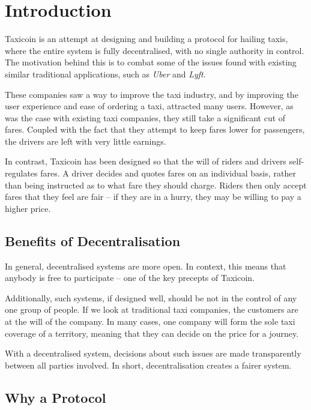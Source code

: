 \section{Introduction}

Taxicoin is an attempt at designing and building a protocol for hailing taxis, where the entire system is fully decentralised, with no single authority in control. The motivation behind this is to combat some of the issues found with existing similar traditional applications, such as \textit{Uber} and \textit{Lyft}.

These companies saw a way to improve the taxi industry, and by improving the user experience and ease of ordering a taxi, attracted many users. However, as was the case with existing taxi companies, they still take a significant cut of fares. Coupled with the fact that they attempt to keep fares lower for passengers, the drivers are left with very little earnings.

In contrast, Taxicoin has been designed so that the will of riders and drivers self-regulates fares. A driver decides and quotes fares on an individual basis, rather than being instructed as to what fare they should charge. Riders then only accept fares that they feel are fair -- if they are in a hurry, they may be willing to pay a higher price.

\subsection{Benefits of Decentralisation}

In general, decentralised systems are more open. In context, this means that anybody is free to participate -- one of the key precepts of Taxicoin.

Additionally, such systems, if designed well, should be not in the control of any one group of people. If we look at traditional taxi companies, the customers are at the will of the company. In many cases, one company will form the sole taxi coverage of a territory, meaning that they can decide on the price for a journey.

With a decentralised system, decisions about such issues are made transparently between all parties involved. In short, decentralisation creates a fairer system.

\subsection{Why a Protocol}

